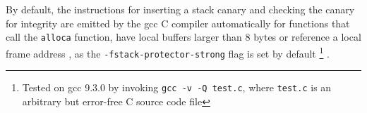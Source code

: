 By default, the instructions for inserting a stack canary and checking the canary for integrity are emitted by the \gls{gcc} C compiler automatically for functions that call the \texttt{alloca} function, have local buffers larger than 8 bytes or reference a local frame address \cite{FSF2019}, as the \texttt{-fstack-protector-strong} flag is set by default%
	\footnote{Tested on \gls{gcc} 9.3.0 by invoking \texttt{gcc -v -Q test.c}, where \texttt{test.c} is an arbitrary but error-free C source code file}%
.
